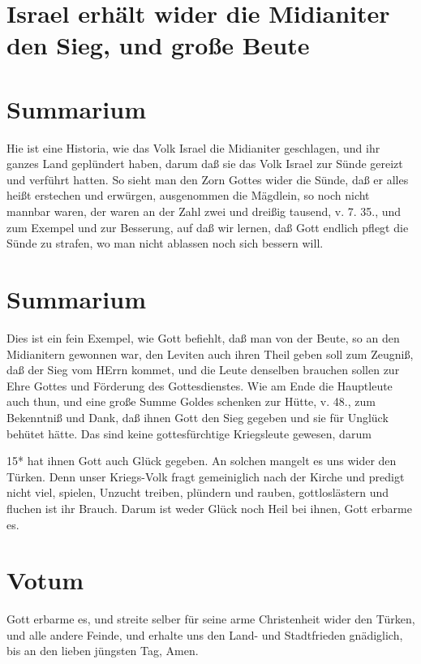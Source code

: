 \section[Israel erhält wider die Midianiter den Sieg, und]{Israel erhält wider die Midianiter den Sieg, und große Beute}

\section{Summarium}

Hie ist eine Historia, wie das Volk Israel die Midianiter geschlagen, und ihr ganzes Land geplündert haben, darum daß sie das Volk Israel zur Sünde gereizt und verführt hatten. So sieht man den Zorn Gottes wider die Sünde, daß er alles heißt erstechen und erwürgen, ausgenommen die Mägdlein, so noch nicht mannbar waren, der waren an der Zahl zwei und dreißig tausend, v. 7. 35., und zum Exempel und zur Besserung, auf daß wir lernen, daß Gott endlich pflegt die Sünde zu strafen, wo man nicht ablassen noch sich bessern will.

\section{Summarium}

Dies ist ein fein Exempel, wie Gott befiehlt, daß man von der Beute, so an den Midianitern gewonnen war, den Leviten auch ihren Theil geben soll zum Zeugniß, daß der Sieg vom HErrn kommet, und die Leute denselben brauchen sollen zur Ehre Gottes und Förderung des Gottesdienstes. Wie am Ende die Hauptleute auch thun, und eine große Summe Goldes schenken zur Hütte, v. 48., zum Bekenntniß und Dank, daß ihnen Gott den Sieg gegeben und sie für Unglück behütet hätte. Das sind keine gottesfürchtige Kriegsleute gewesen, darum

15*
hat ihnen Gott auch Glück gegeben. An solchen mangelt es uns wider den Türken. Denn unser Kriegs-Volk fragt gemeiniglich nach der Kirche und predigt nicht viel, spielen, Unzucht treiben, plündern und rauben, gottloslästern und fluchen ist ihr Brauch. Darum ist weder Glück noch Heil bei ihnen, Gott erbarme es.

\section{Votum}

Gott erbarme es, und streite selber für seine arme Christenheit wider den Türken, und alle andere Feinde, und erhalte uns den Land- und Stadtfrieden gnädiglich, bis an den lieben jüngsten Tag, Amen.

